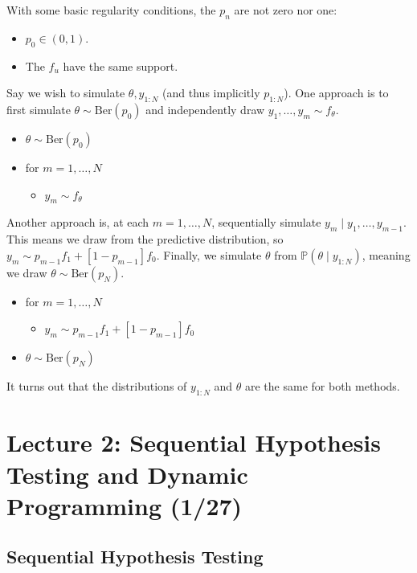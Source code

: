 \documentclass[pdftex,letterpaper,11pt]{article}
\theoremstyle{definition}
\theoremstyle{definition}
\theoremstyle{definition}
\newcommand{\PP}{\mathbb P}
\newcommand{\mrm}[1]{\mathrm{#1}}
\begin{document}
With some basic regularity conditions, the $p_n$ are not zero nor one:
\begin{itemize}
	\item $p_0 \in (0,1)$.
	\item The $f_u$ have the same support.
\end{itemize}

Say we wish to simulate $\theta, y_{1:N}$ (and thus implicitly $p_{1:N}$). One approach is to first simulate $\theta \sim \mrm{Ber}(p_0)$ and independently draw $y_1, \ldots, y_m \sim f_\theta$.
\begin{itemize}
	\item[] $\theta \sim \mrm{Ber}(p_0)$
	\item[] for $m=1, \ldots, N$
		\begin{itemize}
			\item[] $y_m \sim f_\theta$
		\end{itemize}
\end{itemize}

Another approach is, at each $m=1, \ldots, N$, sequentially simulate $y_m \mid y_{1}, \ldots, y_{m-1}$. This means we draw from the predictive distribution, so $y_m \sim p_{m-1}f_1 + [1-p_{m-1}] f_0$. Finally, we simulate $\theta$ from $\PP(\theta \mid y_{1:N})$, meaning we draw $\theta \sim \mrm{Ber}(p_N)$.
\begin{itemize}
	\item[] for $m=1, \ldots, N$
		\begin{itemize}
			\item[] $y_m \sim p_{m-1}f_1 + [1-p_{m-1}]f_0$
		\end{itemize}
	\item[] $\theta \sim \mrm{Ber}(p_N)$
\end{itemize}

It turns out that the distributions of $y_{1:N}$ and $\theta$ are the same for both methods.

\section*{Lecture 2: Sequential Hypothesis Testing and Dynamic Programming (1/27)}

\subsection*{Sequential Hypothesis Testing}
\end{document}
